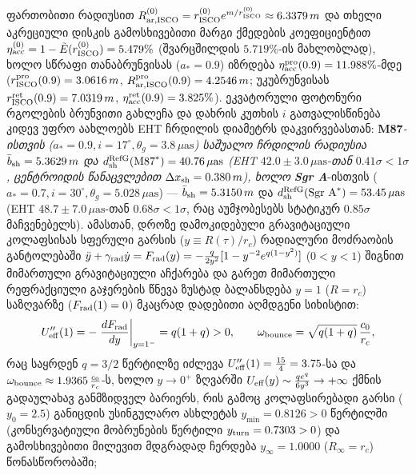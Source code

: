\documentclass[11pt,a4paper]{article}
\begin{document}
\begin{enumerate}[label=\arabic*.]
ფართობითი რადიუსით $R_{\rm ar, ISCO}^{(0)} = r_{\rm ISCO}^{(0)}e^{m/r_{\rm ISCO}^{(0)}} \approx 6.3379\,m$ და თხელი აკრეციული დისკის გამოსხივებითი მარგი ქმედების კოეფიციენტით $\eta_{\rm acc}^{(0)} = 1 - \tilde{E}(r_{\rm ISCO}^{(0)}) = 5.479\%$ (შვარცშილდის $5.719\%$-ის მახლობლად), ხოლო სწრაფი თანაბრუნვისას ($a_* = 0.9$) იზრდება $\eta_{\rm acc}^{\rm pro}(0.9) = 11.988\%$-მდე ($r_{\rm ISCO}^{\rm pro}(0.9) = 3.0616\,m$, $R_{\rm ar, ISCO}^{\rm pro}(0.9) = 4.2546\,m$; უკუბრუნვისას $r_{\rm ISCO}^{\rm ret}(0.9) = 7.0319\,m$, $\eta_{\rm acc}^{\rm ret}(0.9) = 3.825\%$). ეკვატორული ფოტონური რგოლების ბრუნვითი გახლეჩა და დახრის კუთხის $i$ გათვალისწინება კიდევ უფრო აახლოებს EHT ჩრდილის დიამეტრს დაკვირვებასთან: \textbf{M87}\emph{-ისთვის ($a_* = 0.9, i = 17^\circ, \theta_g = 3.8\,\mu\text{as}$) საშუალო ჩრდილის რადიუსია $\bar{b}_{\rm sh} = 5.3629\,m$ და \textbf{$d_{\rm sh}^{\rm RefG}(\text{M87}^*) = 40.76\,\mu\text{as}$} (EHT $42.0 \pm 3.0\,\mu\text{as}$-თან \textbf{$0.41\sigma < 1\sigma$}, ცენტროიდის წანაცვლებით $\Delta x_{\rm sh} = 0.380\,m$), ხოლო \textbf{Sgr A}}-ისთვის ($a_* = 0.7, i = 30^\circ, \theta_g = 5.028\,\mu\text{as}$) — $\bar{b}_{\rm sh} = 5.3150\,m$ და \textbf{$d_{\rm sh}^{\rm RefG}(\text{Sgr A}^*) = 53.45\,\mu\text{as}$} (EHT $48.7 \pm 7.0\,\mu\text{as}$-თან \textbf{$0.68\sigma < 1\sigma$}, რაც აუმჯობესებს სტატიკურ $0.85\sigma$ მაჩვენებელს). ამასთან, დროზე დამოკიდებული გრავიტაციული კოლაფსისას სფერული გარსის ($y \equiv R(\tau)/r_c$) რადიალური მოძრაობის განტოლებაში $\ddot{y} + \gamma_{\rm rad}\dot{y} = F_{\rm rad}(y) = -\frac{q}{2y^2}[1 - y^{-2}e^{q(1-y^2)}]$ ($0 < y < 1$) შიგნით მიმართული გრავიტაციული აჩქარება და გარეთ მიმართული რეფრაქციული გაჯერების წნევა ზუსტად ბალანსდება $y = 1$ ($R = r_c$) საზღვარზე ($F_{\rm rad}(1) = 0$) მკაცრად დადებითი აღმდგენი სიხისტით:
\[
   U_{\rm eff}''(1) = -\left.\frac{dF_{\rm rad}}{dy}\right|_{y=1^-} = q(1 + q) > 0, \qquad \omega_{\rm bounce} = \sqrt{q(1+q)}\,\frac{c_0}{r_c},
\]
რაც საყრდენ $q = 3/2$ წერტილზე იძლევა $U_{\rm eff}''(1) = \frac{15}{4} = 3.75$-სა და $\omega_{\rm bounce} \approx 1.9365\,\frac{c_0}{r_c}$-ს, ხოლო $y \to 0^+$ ზღვარში $U_{\rm eff}(y) \sim \frac{q e^q}{6 y^3} \to +\infty$ ქმნის გადაულახავ განმზიდველ ბარიერს, რის გამოც კოლაფსირებადი გარსი ($y_0 = 2.5$) განიცდის უსინგულარო ასხლეტას $y_{\min} = 0.8126 > 0$ წერტილში (კონსერვატიული მობრუნების წერტილი $y_{\rm turn} = 0.7303 > 0$) და გამოსხივებითი მილევით მდგრადად ჩერდება $y_\infty = 1.0000$ ($R_\infty = r_c$) წონასწორობაში;

\end{enumerate}
\end{document}
